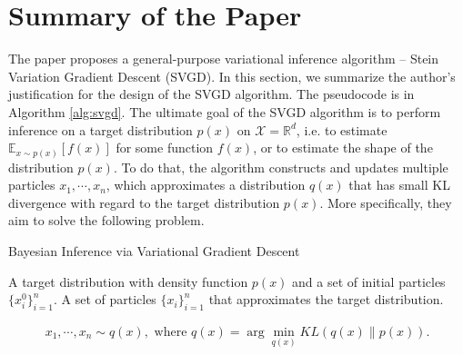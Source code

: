 \section{Summary of the Paper}

The paper proposes a general-purpose variational inference algorithm -- Stein Variation Gradient Descent (SVGD). In this section, we summarize the author's justification for the design of the SVGD algorithm. The pseudocode is in Algorithm \ref{alg:svgd}. The ultimate goal of the SVGD algorithm is to perform inference on a target distribution $p(x)$ on $\mathcal{X}=\mathbb{R}^d$, i.e. to estimate $\mathbb{E}_{x\sim p(x)}[f(x)]$ for some function $f(x)$, or to estimate the shape of the distribution $p(x)$. To do that, the algorithm constructs and updates multiple particles $x_1, \cdots, x_n$, which approximates a distribution $q(x)$ that has small KL divergence with regard to the target distribution $p(x)$. More specifically, they aim to solve the following problem.



\begin{algorithm}[t!]
	\caption{Bayesian Inference via Variational Gradient Descent~\cite{ref_article_svgd}}
	\label{alg:svgd}
	\begin{algorithmic}
		 A target distribution with density function $p(x)$ and a set of initial particles $\{x_i^0\}_{i=1}^n$.
		 A set of particles $\{x_i\}_{i=1}^n$ that approximates the target distribution.
		\ENDFOR
	\end{algorithmic}
\end{algorithm}

\begin{align}
    x_1,\cdots,x_n\sim q(x), \text{ where }q(x) = \arg\min_{q(x)} KL(q(x)\lVert p(x)).
\end{align}

